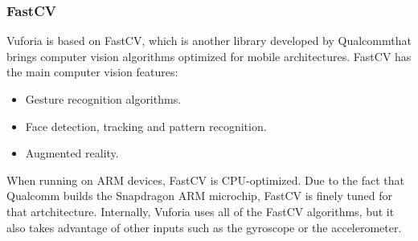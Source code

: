 \subsubsection{FastCV}
Vuforia is based on FastCV, which is another library developed by
Qualcomm\textregistered that brings computer vision algorithms optimized for mobile
architectures. FastCV has the main computer vision features\cite{fastcv}:

\begin{itemize}
\item Gesture recognition algorithms.
\item Face detection, tracking and pattern recognition.
\item Augmented reality.
\end{itemize}

When running on ARM devices, FastCV is CPU-optimized. Due to the fact that Qualcomm
builds the Snapdragon ARM microchip, FastCV is finely tuned for that artchitecture. 
Internally, Vuforia uses all of the FastCV algorithms, but it also takes advantage
of other inputs such as the gyroscope or the accelerometer.
